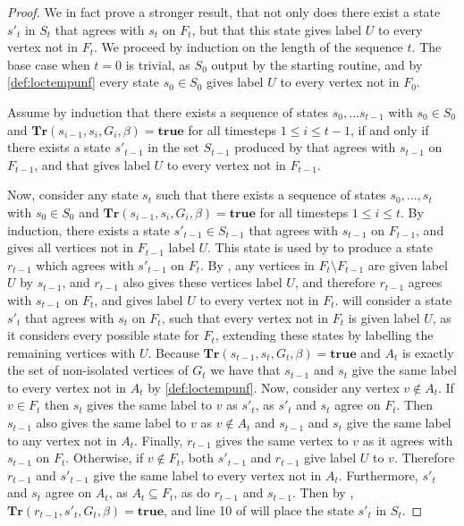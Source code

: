 \documentclass[a4paper,UKenglish,cleveref, autoref, thm-restate]{lipics-v2021} %
\begin{document}
\begin{toappendix}
\begin{proof}
    We in fact prove a stronger result, that not only does there exist a state $s'_t$ in $S_t$ that agrees with $s_t$ on $F_t$, but that this state gives label $U$ to every vertex not in $F_t$. We proceed by induction on the length of the sequence $t$. The base case when $t=0$ is trivial, as $S_0$ output by the starting routine, and by \cref{def:loctempunf} every state $s_0 \in S_0$ gives label $U$ to every vertex not in $F_0$.

    Assume by induction that there exists a sequence of states $s_0, ... s_{t-1}$ with $s_0 \in S_0$ and $\textbf{Tr}(s_{i-1}, s_i, G_i,\beta)=\textbf{true}$ for all timesteps $1 \leq i \leq t-1$, if and only if there exists a state $s'_{t-1}$ in the set $S_{t-1}$ produced by  that agrees with $s_{t-1}$ on $F_{t-1}$, and that gives label $U$ to every vertex not in $F_{t-1}$.

    Now, consider any state $s_t$ such that there exists a sequence of states $s_0, \ldots, s_t$ with $s_0 \in S_0$ and $\textbf{Tr}(s_{i-1}, s_i, G_i,\beta)=\textbf{true}$ for all timesteps $1 \leq i \leq t$.  By induction, there exists a state $s'_{t-1} \in S_{t-1}$ that agrees with $s_{t-1}$ on $F_{t-1}$, and gives all vertices not in $F_{t-1}$ label $U$. This state is used by  to produce a state $r_{t-1}$ which agrees with $s'_{t-1}$ on $F_t$. By , any vertices in $F_t \setminus F_{t-1}$ are given label $U$ by $s_{t-1}$, and $r_{t-1}$ also gives these vertices label $U$, and therefore $r_{t-1}$ agrees with $s_{t-1}$ on $F_t$, and gives label $U$ to every vertex not in $F_t$.  will consider a state $s'_t$ that agrees with $s_t$ on $F_t$, such that every vertex not in $F_t$ is given label $U$, as it considers every possible state for $F_t$, extending these states by labelling the remaining vertices with $U$. Because $\textbf{Tr}(s_{t-1}, s_t, G_t,\beta)=\textbf{true}$ and $A_t$ is exactly the set of non-isolated vertices of $G_t$ we have that $s_{t-1}$ and $s_t$ give the same label to every vertex not in $A_t$ by \cref{def:loctempunf}. Now, consider any vertex $v \notin A_t$. If $v \in F_t$ then $s_t$ gives the same label to $v$ as $s'_t$, as $s'_t$ and $s_t$ agree on $F_t$. Then $s_{t-1}$ also gives the same label to $v$ as $v \notin A_t$ and $s_{t-1}$ and $s_t$ give the same label to any vertex not in $A_t$. Finally, $r_{t-1}$ gives the same vertex to $v$ as it agrees with $s_{t-1}$ on $F_t$. Otherwise, if $v \notin F_t$, both $s'_{t-1}$ and $r_{t-1}$ give label $U$ to $v$. Therefore $r_{t-1}$ and $s'_{t-1}$ give the same label to every vertex not in $A_t$. Furthermore, $s'_t$ and $s_t$ agree on $A_t$, as $A_t \subseteq F_t$, as do $r_{t-1}$ and $s_{t-1}$. Then by , $\textbf{Tr}(r_{t-1}, s'_t, G_t,\beta)=\textbf{true}$, and line 10 of  will place the state $s'_t$ in $S_t$.


\end{proof}
\end{toappendix}
\end{document}
